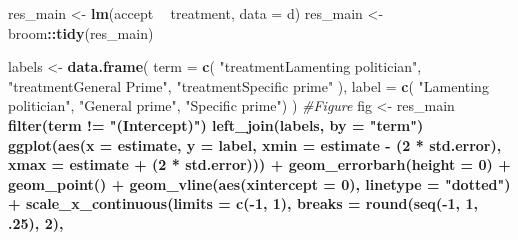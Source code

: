 \documentclass[]{book}
\newenvironment{Shaded}{\begin{snugshade}}{\end{snugshade}}
\newcommand{\KeywordTok}[1]{\textcolor[rgb]{0.13,0.29,0.53}{\textbf{#1}}}
\newcommand{\DataTypeTok}[1]{\textcolor[rgb]{0.13,0.29,0.53}{#1}}
\newcommand{\DecValTok}[1]{\textcolor[rgb]{0.00,0.00,0.81}{#1}}
\newcommand{\StringTok}[1]{\textcolor[rgb]{0.31,0.60,0.02}{#1}}
\newcommand{\CommentTok}[1]{\textcolor[rgb]{0.56,0.35,0.01}{\textit{#1}}}
\newcommand{\OperatorTok}[1]{\textcolor[rgb]{0.81,0.36,0.00}{\textbf{#1}}}
\newcommand{\NormalTok}[1]{#1}
\begin{document}
\begin{Shaded}
\begin{Highlighting}[]
\NormalTok{res_main <-}\StringTok{  }\KeywordTok{lm}\NormalTok{(accept }\OperatorTok{~}\StringTok{ }\NormalTok{treatment, }\DataTypeTok{data =}\NormalTok{ d) }
\NormalTok{res_main <-}\StringTok{ }\NormalTok{broom}\OperatorTok{::}\KeywordTok{tidy}\NormalTok{(res_main)}

\NormalTok{labels <-}\StringTok{ }\KeywordTok{data.frame}\NormalTok{(}
  \DataTypeTok{term =} \KeywordTok{c}\NormalTok{(}
    \StringTok{"treatmentLamenting politician"}\NormalTok{,}
    \StringTok{"treatmentGeneral Prime"}\NormalTok{,}
    \StringTok{"treatmentSpecific prime"}
\NormalTok{  ),}
  \DataTypeTok{label =} \KeywordTok{c}\NormalTok{( }\StringTok{"Lamenting politician"}\NormalTok{,}
             \StringTok{"General prime"}\NormalTok{,}
             \StringTok{"Specific prime"}\NormalTok{)}
\NormalTok{)}
\CommentTok{#Figure}
\NormalTok{fig <-}\StringTok{   }\NormalTok{res_main }\OperatorTok{%>%}
\StringTok{  }\KeywordTok{filter}\NormalTok{(term }\OperatorTok{!=}\StringTok{ "(Intercept)"}\NormalTok{) }\OperatorTok{%>%}\StringTok{ }
\StringTok{  }\KeywordTok{left_join}\NormalTok{(labels, }\DataTypeTok{by =} \StringTok{"term"}\NormalTok{) }\OperatorTok{%>%}\StringTok{ }
\StringTok{  }
\StringTok{  }\KeywordTok{ggplot}\NormalTok{(}\KeywordTok{aes}\NormalTok{(}\DataTypeTok{x =}\NormalTok{ estimate, }\DataTypeTok{y =}\NormalTok{ label,}
             \DataTypeTok{xmin =}\NormalTok{ estimate }\OperatorTok{-}\StringTok{ }\NormalTok{(}\DecValTok{2} \OperatorTok{*}\StringTok{ }\NormalTok{std.error),}
             \DataTypeTok{xmax =}\NormalTok{ estimate }\OperatorTok{+}\StringTok{ }\NormalTok{(}\DecValTok{2} \OperatorTok{*}\StringTok{ }\NormalTok{std.error))) }\OperatorTok{+}
\StringTok{   }\KeywordTok{geom_errorbarh}\NormalTok{(}\DataTypeTok{height =} \DecValTok{0}\NormalTok{) }\OperatorTok{+}
\StringTok{  }\KeywordTok{geom_point}\NormalTok{() }\OperatorTok{+}
\StringTok{  }\KeywordTok{geom_vline}\NormalTok{(}\KeywordTok{aes}\NormalTok{(}\DataTypeTok{xintercept =} \DecValTok{0}\NormalTok{), }\DataTypeTok{linetype =} \StringTok{"dotted"}\NormalTok{) }\OperatorTok{+}
\StringTok{  }\KeywordTok{scale_x_continuous}\NormalTok{(}\DataTypeTok{limits =} \KeywordTok{c}\NormalTok{(}\OperatorTok{-}\DecValTok{1}\NormalTok{, }\DecValTok{1}\NormalTok{),}
                     \DataTypeTok{breaks =} \KeywordTok{round}\NormalTok{(}\KeywordTok{seq}\NormalTok{(}\OperatorTok{-}\DecValTok{1}\NormalTok{, }\DecValTok{1}\NormalTok{, .}\DecValTok{25}\NormalTok{), }\DecValTok{2}\NormalTok{),}
}}}
\end{Highlighting}
\end{Shaded}
\end{document}
